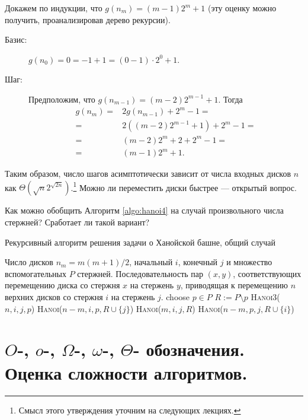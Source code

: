 \documentclass[a4paper,12pt]{article}
\begin{document}
Докажем по индукции, что $g(n_m) = (m - 1)2^m + 1$ (эту оценку можно получить, проанализировав дерево рекурсии).
\begin{description}
	\item[Базис:] $g(n_0) = 0 = -1 + 1 = (0 - 1) \cdot 2^0 + 1$.
	\item[Шаг:] Предположим, что $g(n_{m-1}) = (m - 2)2^{m-1} + 1$. Тогда
	\begin{align*} %
	   g(n_m) = {}& 2g(n_{m-1}) + 2^m - 1 = \\
	   = {}& 2((m - 2)2^{m-1} + 1) + 2^m - 1 = \\
	   = {}& (m - 2)2^m + 2 + 2^m - 1 = \\
	   = {}& (m - 1)2^m + 1.
	\end{align*}
\end{description}

Таким образом, число шагов асимптотически зависит от числа входных дисков $n$ как $\Theta(\sqrt{n}2^{\sqrt{2n}})$.\footnote{Смысл этого утверждения уточним на следующих лекциях.} Можно ли переместить диски быстрее --- открытый вопрос.

Как можно обобщить Алгоритм \ref{algo:hanoi4} на случай произвольного числа стержней? Сработает ли такой вариант?

\begin{algorithm}[H]
	\caption{Рекурсивный алгоритм решения задачи о Ханойской башне, общий случай}
	\label{algo:hanoik}
	\begin{algorithmic}[1]
		\Require Число дисков $n_m = m(m+1)/2$, начальный $i$, конечный $j$ и множество вспомогательных $P$ стержней.
		\Ensure Последовательность пар $(x, y)$, соответствующих перемещению диска со стержня $x$ на стержень $y$, приводящая к перемещению $n$ верхних дисков со стержня $i$ на стержень $j$.
				\State choose $p \in P$
				\State $R \mathrel{:=} P \setminus p$
					\State \textsc{Hanoi3}($n,i,j,p$)
				\Else
					\State \textsc{Hanoi}($n-m,i,p,R \cup \{j\}$)
					\State \textsc{Hanoi}($m,i,j,R$)
					\State \textsc{Hanoi}($n-m,p,j,R \cup \{i\}$)
				\EndIf
			\EndIf
		\EndFunction
	\end{algorithmic}
\end{algorithm}
\newpage
\section{\(O\)-, \(o\)-, \(\Omega\)-, \(\omega\)-, \(\Theta\)- обозначения. Оценка сложности алгоритмов.}
\end{document}
